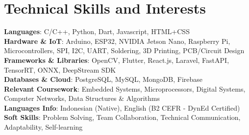 \documentclass[a4paper,11pt]{article}
\begin{document}
\section{\textbf{Technical Skills and Interests}}
\begin{itemize}[leftmargin=0.05in, label={}]
  \small{\item{
        \textbf{Languages}{: C/C++, Python, Dart, Javascript, HTML+CSS } \\
        \textbf{Hardware \& IoT}{: Arduino, ESP32, NVIDIA Jetson Nano, Raspberry Pi, Microcontrollers, SPI, I2C, UART, Soldering, 3D Printing, PCB/Circuit Design } \\
        \textbf{Frameworks \& Libraries}{: OpenCV, Flutter, React.js, Laravel, FastAPI, TensorRT, ONNX, DeepStream SDK } \\
        \textbf{Databases \& Cloud}{: PostgreSQL, MySQL, MongoDB, Firebase } \\
        \textbf{Relevant Coursework}{: Embedded Systems, Microprocessors, Digital Systems, Computer Networks, Data Structures \& Algorithms } \\
        \textbf{Languages Info}{: Indonesian (Native), English (B2 CEFR - DynEd Certified) } \\
        \textbf{Soft Skills}{: Problem Solving, Team Collaboration, Technical Communication, Adaptability, Self-learning}
        }}
\end{itemize}
\vspace{-16pt}
\end{document}
